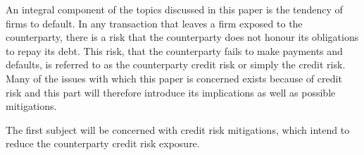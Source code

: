 \documentclass[main.tex]{subfiles}
\begin{document}
    An integral component of the topics discussed in this paper is the tendency of firms to default.
    In any transaction that leaves a firm exposed to the counterparty,
    there is a risk that the counterparty does not honour its obligations to repay its debt.
    This risk, that the counterparty fails to make payments and defaults, 
    is referred to as the counterparty credit risk or simply the credit risk.
    Many of the issues with which this paper is concerned exists because of credit risk 
    and this part will therefore introduce its implications as well as possible mitigations.

    The first subject will be concerned with credit risk mitigations,
    which intend to reduce the counterparty credit risk exposure.
\end{document}

